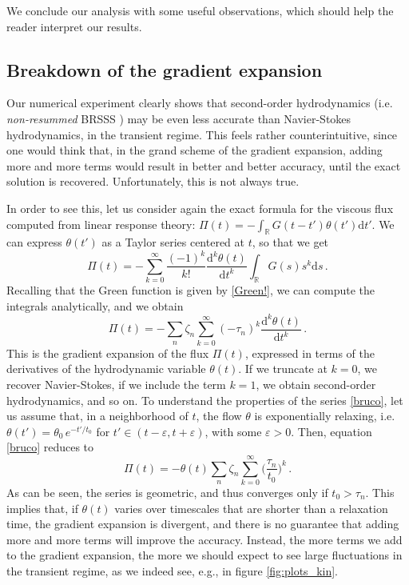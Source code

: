 \documentclass[a4paper, amsfonts, amssymb, amsmath, reprint, showkeys, nofootinbib, twoside, onecolumn,notitlepage]{revtex4-2}
\renewcommand{\d}{\mathrm{d}}
\begin{document}
We conclude our analysis with some useful observations, which should help the reader interpret our results.

\subsection{Breakdown of the gradient expansion}

Our numerical experiment clearly shows that second-order hydrodynamics (i.e. \textit{non-resummed} BRSSS \cite{Baier2008}) may be even less accurate than Navier-Stokes hydrodynamics, in the transient regime. This feels rather counterintuitive, since one would think that, in the grand scheme of the gradient expansion, adding more and more terms would result in better and better accuracy, until the exact solution is recovered. Unfortunately, this is not always true.

In order to see this, let us consider again the exact formula for the viscous flux computed from linear response theory: $\Pi(t)=-\int_{\mathbb{R}} G(t{-}t')\theta(t')\d t'$. We can express $\theta(t')$ as a Taylor series centered at $t$, so that we get
\begin{equation}
    \Pi(t) = -\sum_{k=0}^{\infty} \dfrac{(-1)^k}{k!}\dfrac{\d^k \theta(t)}{\d t^k} \int_{\mathbb{R}} G(s)s^k \d s \, .
\end{equation}
Recalling that the Green function is given by \eqref{Green!}, we can compute the integrals analytically, and we obtain
\begin{equation}\label{bruco}
    \Pi(t) = -\sum_n \zeta_n \sum_{k=0}^{\infty}(-\tau_n)^k \dfrac{\d^k \theta(t)}{\d t^k}  \, .
\end{equation}
This is the gradient expansion of the flux $\Pi(t)$, expressed in terms of the derivatives of the hydrodynamic variable $\theta(t)$. If we truncate at $k{=}0$, we recover Navier-Stokes, if we include the term $k{=}1$, we obtain second-order hydrodynamics, and so on. To understand the properties of the series \eqref{bruco}, let us assume that, in a neighborhood of $t$, the flow $\theta$ is exponentially relaxing, i.e. $\theta(t')=\theta_0 \, e^{-t'/t_0}$ for $t' \in (t{-}\varepsilon,t{+}\varepsilon)$, with some $\varepsilon>0$. Then, equation \eqref{bruco} reduces to
\begin{equation}
    \Pi(t)=-\theta(t)\sum_n \zeta_n \sum_{k=0}^{\infty} \bigg( \dfrac{\tau_n}{t_0}\bigg)^k \, .
\end{equation}
As can be seen, the series is geometric, and thus converges only if $t_0 > \tau_n$. This implies that, if $\theta(t)$ varies over timescales that are shorter than a relaxation time, the gradient expansion is divergent, and there is no guarantee that adding more and more terms will improve the accuracy. Instead, the more terms we add to the gradient expansion, the more we should expect to see large fluctuations in the transient regime, as we indeed see, e.g., in figure \ref{fig:plots_kin}.
\end{document}
